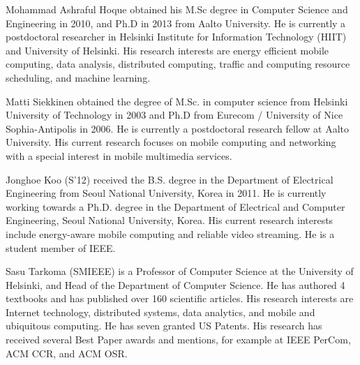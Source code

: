 \documentclass[journal]{IEEEtran}
\begin{document}
\vspace{-2cm}
\begin{biography}{Mohammad Ashraful Hoque}
obtained his M.Sc degree in Computer Science and Engineering in 2010, and Ph.D in 2013 from Aalto University. He is currently a postdoctoral researcher in Helsinki Institute for Information Technology (HIIT) and University of Helsinki. His research interests are energy efficient mobile computing, data analysis, distributed computing, traffic and computing resource scheduling, and machine learning.
\end{biography}
\vspace{-2cm}
\begin{biography}{Matti Siekkinen}
obtained the degree of M.Sc. in computer science from Helsinki University of Technology in 2003 and Ph.D from Eurecom / University of Nice Sophia-Antipolis in 2006. He is currently a postdoctoral research fellow at Aalto University. His current research focuses on mobile computing and networking with a special interest in mobile multimedia services.
\end{biography}
\vspace{-2cm}
\begin{biography}{Jonghoe Koo}
(S'12) received the B.S. degree in the Department of Electrical Engineering from Seoul National University, Korea in 2011. 
He is currently working towards a Ph.D. degree in the Department of Electrical and Computer Engineering, Seoul National University, Korea. His current research interests include energy-aware mobile computing and reliable video streaming. He is a student member of IEEE.
\end{biography}

\vspace{-2cm}
\begin{biography}{Sasu Tarkoma}
(SMIEEE) is a Professor of Computer Science at the University of Helsinki, and Head of the Department of Computer Science. He has authored 4 textbooks and has published over 160 scientific articles.  His research interests are Internet technology, distributed systems, data analytics, and mobile and ubiquitous computing.  He has seven granted US Patents. His research has received several Best Paper awards and mentions, for example at IEEE PerCom, ACM CCR, and ACM OSR. \end{biography}
\end{document}
